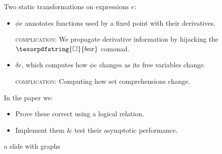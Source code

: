 \documentclass[aspectratio=169,dvipsnames]{beamer}
\providecommand\strong[1]{{\bfseries#1}}
\newcommand\iso{{\texorpdfstring{\ensuremath{\square}}{box}}}
\newcommand\fix{\n{fix}}
\newcommand\semifix{\n{semifix}}
\newcommand\hilite{\color{Rhodamine}}
\newcommand\hi[1]{{\hilite#1}}
\begin{document}


  \begin{frame}

    Two static transformations on expressions $e$:
    \vspace{1ex}
    \begin{itemize}
    \item \hi{$\phi e$} annotates functions used by a fixed point with their
      derivatives.\\[1ex]

      {\normalsize\sffamily\textsc{complication:}\: We propagate
        derivative information by hijacking the $\iso$ comonad.\par}

    \item \hi{$\delta e$}, which computes how $\phi e$ changes as
      its free variables change.
      \\[1ex]
      {\normalsize\sffamily\textsc{complication:}\:
        Computing how set comprehensions change.
        \par}
    \end{itemize}
    \vspace{\baselineskip}

    In the paper we:\vspace{1ex}
    \begin{itemize}
    \item Prove these correct using a logical relation.
    \item Implement them \& test their asymptotic performance.
    \end{itemize}
    \vspace{\baselineskip}
  \end{frame}


  \begin{frame}
    \centering\Huge\color{red} a slide with graphs
  \end{frame}
\end{document}
